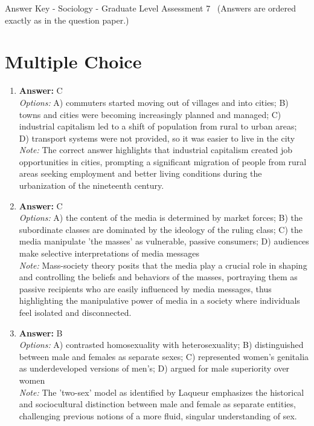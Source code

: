 \documentclass[12pt]{article}
\begin{document}
\begin{center}
Answer Key - Sociology - Graduate Level Assessment 7 \
\small (Answers are ordered exactly as in the question paper.)
\end{center}

\section*{Multiple Choice}
\begin{enumerate}[label=\arabic*.]
\item \textbf{Answer:} C
\\ \textit{Options:} A) commuters started moving out of villages and into cities; B) towns and cities were becoming increasingly planned and managed; C) industrial capitalism led to a shift of population from rural to urban areas; D) transport systems were not provided, so it was easier to live in the city
\\ \textit{Note:} The correct answer highlights that industrial capitalism created job opportunities in cities, prompting a significant migration of people from rural areas seeking employment and better living conditions during the urbanization of the nineteenth century.
\item \textbf{Answer:} C
\\ \textit{Options:} A) the content of the media is determined by market forces; B) the subordinate classes are dominated by the ideology of the ruling class; C) the media manipulate 'the masses' as vulnerable, passive consumers; D) audiences make selective interpretations of media messages
\\ \textit{Note:} Mass-society theory posits that the media play a crucial role in shaping and controlling the beliefs and behaviors of the masses, portraying them as passive recipients who are easily influenced by media messages, thus highlighting the manipulative power of media in a society where individuals feel isolated and disconnected.
\item \textbf{Answer:} B
\\ \textit{Options:} A) contrasted homosexuality with heterosexuality; B) distinguished between male and females as separate sexes; C) represented women's genitalia as underdeveloped versions of men's; D) argued for male superiority over women
\\ \textit{Note:} The 'two-sex' model as identified by Laqueur emphasizes the historical and sociocultural distinction between male and female as separate entities, challenging previous notions of a more fluid, singular understanding of sex.

\end{enumerate}
\end{document}
